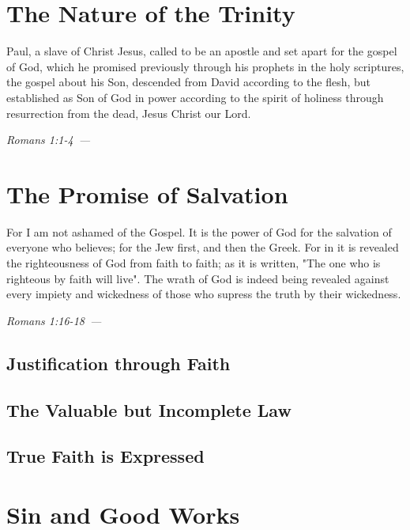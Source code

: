 \documentclass[10pt]{article}
\let\oldquote\quote
\let\endoldquote\endquote
\renewenvironment{quote}[2][]
  {\if\relax\detokenize{#1}\relax
     \def\quoteauthor{#2}%
   \else
     \def\quoteauthor{#2~---~#1}%
   \fi
   \oldquote}
  {\par\nobreak\smallskip\hfill\textit{\quoteauthor}%
   \endoldquote\addvspace{\bigskipamount}}
\begin{document}
\section*{The Nature of the Trinity}
\begin{quote}{Romans 1:1-4}
Paul, a slave of Christ Jesus, called to be an apostle and set apart for the gospel of God, which he promised previously through his prophets in the holy scriptures, the gospel about his Son, descended from David according to the flesh, but established as Son of God in power according to the spirit of holiness through resurrection from the dead, Jesus Christ our Lord.
\end{quote}

\section*{The Promise of Salvation}
\begin{quote}{Romans 1:16-18}
For I am not ashamed of the Gospel. It is the power of God for the salvation of everyone who believes; for the Jew first, and then the Greek. For in it is revealed the righteousness of God from faith to faith; as it is written, "The one who is righteous by faith will live". The wrath of God is indeed being revealed against every impiety and wickedness of those who supress the truth by their wickedness. 
\end{quote}

\subsection*{Justification through Faith}


\subsection*{The Valuable but Incomplete Law}


\subsection*{True Faith is Expressed}


\section*{Sin and Good Works}
\end{document}
